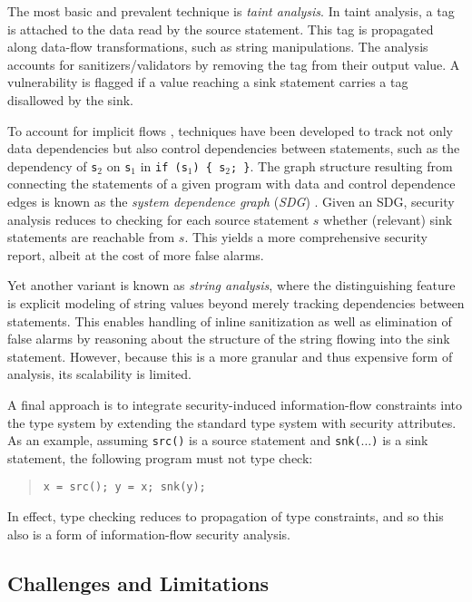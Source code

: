 The most basic and prevalent technique is \emph{taint analysis}. In taint analysis, a tag is attached to the data read by the source statement. This tag is propagated along data-flow transformations, such as string manipulations. The analysis accounts for sanitizers/validators by removing the tag from their output value. A vulnerability is flagged if a value reaching a sink statement carries a tag disallowed by the sink.

To account for implicit flows \cite{XXX}, techniques have been developed to track not only data dependencies but also control dependencies between statements, such as the dependency of {\tt s$_2$} on {\tt s$_1$} in {\tt if (s$_1$) \{ s$_2$; \}}. The graph structure resulting from connecting the statements of a given program with data and control dependence edges is known as the \emph{system dependence graph} (\emph{SDG}) \cite{XXX}. Given an SDG, security analysis reduces to checking for each source statement $s$ whether (relevant) sink statements are reachable from $s$. This yields a more comprehensive security report, albeit at the cost of more false alarms.

Yet another variant is known as \emph{string analysis}, where the distinguishing feature is explicit modeling of string values \cite{XXX} beyond merely tracking dependencies between statements. This enables handling of inline sanitization as well as elimination of false alarms by reasoning about the structure of the string flowing into the sink statement. However, because this is a more granular and thus expensive form of analysis, its scalability is limited.

A final approach is to integrate security-induced information-flow constraints into the type system \cite{XXX} by extending the standard type system with security attributes. As an example, assuming {\tt src()} is a source statement and {\tt snk($\ldots$)} is a sink statement, the following program must not type check:
\begin{quote}
	{\tt x = src(); y = x; snk(y);}
\end{quote}
In effect, type checking reduces to propagation of type constraints, and so this also is a form of information-flow security analysis. 

\subsection{Challenges and Limitations}

